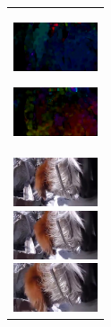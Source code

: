 \begin{figure}[htbp]
\begin{tabular}{l}
\begin{minipage}{0.165\hsize}
        \begin{center}
          \includegraphics[clip, width=2.5cm]{./Figures/optic_look4.eps}
          \hspace{0.1cm} { }
        \end{center}
      \end{minipage}
      \begin{minipage}{0.165\hsize}
        \begin{center}
          \includegraphics[clip, width=2.5cm]{./Figures/optic_look5.eps}
          \hspace{2.2cm} { }
        \end{center}
      \end{minipage}
\\ %
      \begin{minipage}{0.165\hsize}
        \begin{center}
          \includegraphics[clip, width=2.5cm]{./Figures/still_sniffcling1.eps}
        \end{center}
      \end{minipage}
      \begin{minipage}{0.165\hsize}
        \begin{center}
          \includegraphics[clip, width=2.5cm]{./Figures/still_sniffcling2.eps}
        \end{center}
      \end{minipage}
      \begin{minipage}{0.165\hsize}
        \begin{center}
          \includegraphics[clip, width=2.5cm]{./Figures/still_sniffcling3.eps}

\end{center}
\end{minipage}
\end{tabular}
\end{figure}
